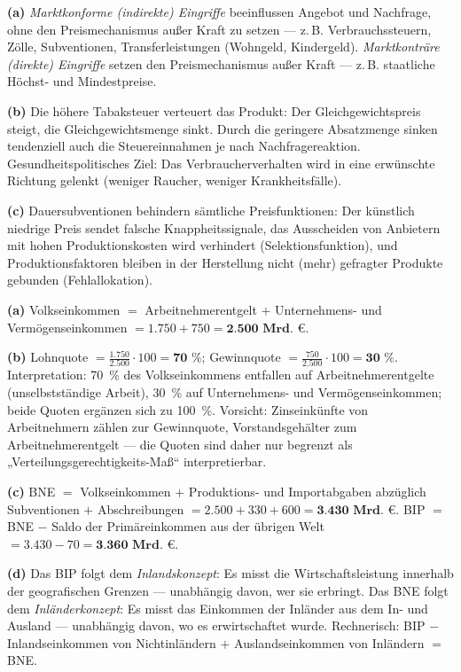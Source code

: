 \documentclass[11pt, a4paper]{article}
\begin{document}
\begin{loesung}[title={Lösung Aufgabe~6 --- Marktkonforme Eingriffe}]
\textbf{(a)} \emph{Marktkonforme (indirekte) Eingriffe} beeinflussen Angebot und
Nachfrage, ohne den Preismechanismus außer Kraft zu setzen --- z.\,B. Verbrauchssteuern,
Zölle, Subventionen, Transferleistungen (Wohngeld, Kindergeld).
\emph{Marktkonträre (direkte) Eingriffe} setzen den Preismechanismus außer Kraft ---
z.\,B. staatliche Höchst- und Mindestpreise.

\textbf{(b)} Die höhere Tabaksteuer verteuert das Produkt: Der Gleichgewichtspreis
steigt, die Gleichgewichtsmenge sinkt. Durch die geringere Absatzmenge sinken tendenziell
auch die Steuereinnahmen je nach Nachfragereaktion. Gesundheitspolitisches Ziel: Das
Verbraucherverhalten wird in eine erwünschte Richtung gelenkt (weniger Raucher, weniger
Krankheitsfälle).

\textbf{(c)} Dauersubventionen behindern sämtliche Preisfunktionen: Der künstlich
niedrige Preis sendet falsche Knappheitssignale, das Ausscheiden von Anbietern mit hohen
Produktionskosten wird verhindert (Selektionsfunktion), und Produktionsfaktoren bleiben
in der Herstellung nicht (mehr) gefragter Produkte gebunden (Fehlallokation).
\end{loesung}

\begin{loesung}[title={Lösung Aufgabe~7 --- VGR: Volkseinkommen, Lohn- und Gewinnquote}]
\textbf{(a)} Volkseinkommen $=$ Arbeitnehmerentgelt $+$ Unternehmens- und
Vermögenseinkommen $= 1.750 + 750 = \textbf{2.500 Mrd.~€}$.

\textbf{(b)} Lohnquote $= \frac{1.750}{2.500} \cdot 100 = \textbf{70~\%}$;
Gewinnquote $= \frac{750}{2.500} \cdot 100 = \textbf{30~\%}$.
Interpretation: 70~\% des Volkseinkommens entfallen auf Arbeitnehmerentgelte
(unselbstständige Arbeit), 30~\% auf Unternehmens- und Vermögenseinkommen; beide Quoten
ergänzen sich zu 100~\%. Vorsicht: Zinseinkünfte von Arbeitnehmern zählen zur
Gewinnquote, Vorstandsgehälter zum Arbeitnehmerentgelt --- die Quoten sind daher nur
begrenzt als „Verteilungsgerechtigkeits-Maß`` interpretierbar.

\textbf{(c)} BNE $=$ Volkseinkommen $+$ Produktions- und Importabgaben abzüglich
Subventionen $+$ Abschreibungen $= 2.500 + 330 + 600 = \textbf{3.430 Mrd.~€}$.
BIP $=$ BNE $-$ Saldo der Primäreinkommen aus der übrigen Welt
$= 3.430 - 70 = \textbf{3.360 Mrd.~€}$.

\textbf{(d)} Das BIP folgt dem \emph{Inlandskonzept}: Es misst die Wirtschaftsleistung
innerhalb der geografischen Grenzen --- unabhängig davon, wer sie erbringt. Das BNE folgt
dem \emph{Inländerkonzept}: Es misst das Einkommen der Inländer aus dem In- und Ausland
--- unabhängig davon, wo es erwirtschaftet wurde. Rechnerisch: BIP $-$ Inlandseinkommen
von Nichtinländern $+$ Auslandseinkommen von Inländern $=$ BNE.
\end{loesung}
\end{document}
